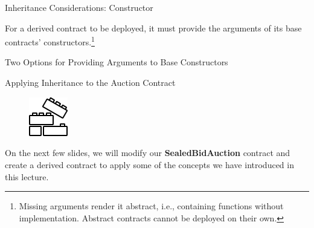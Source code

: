 \documentclass[handout]{beamer}
\begin{document}
\begin{frame}{Inheritance Considerations: Constructor}

For a derived contract to be deployed, it must provide the arguments of its base contracts' constructors.\footnote{Missing arguments render it abstract, i.e., containing functions without implementation. Abstract contracts cannot be deployed on their own.}

\begin{samplecode}{Two Options for Providing Arguments to Base Constructors}
	
\end{samplecode}


\end{frame}


\begin{frame}{Applying Inheritance to the Auction Contract}

\begin{minipage}{0.3\textwidth}
	\begin{figure}
		\center
		\vspace{-1em}
		\includegraphics[width= 1.7cm]{../assets/images/construction.png}	
	\end{figure}
\end{minipage}
\begin{minipage}{0.65\textwidth}
	On the next few slides, we will modify our \textbf{SealedBidAuction} contract and create a derived contract to apply some of the concepts we have introduced in this lecture. \\
\end{minipage}

\vspace{2em}


\end{frame}
\end{document}
